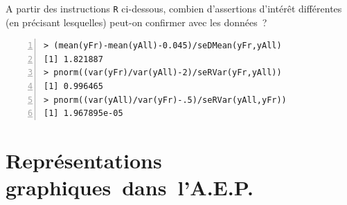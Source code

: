 \documentclass[10pt]{report}
\begin{document}
\begin{exercice}
A partir des instructions \texttt{R} ci-dessous, combien d'assertions d'intérêt différentes (en précisant lesquelles) peut-on confirmer avec les données~?

\begin{Verbatim}[frame=leftline,fontfamily=tt,fontshape=n,numbers=left]
> (mean(yFr)-mean(yAll)-0.045)/seDMean(yFr,yAll)
[1] 1.821887
> pnorm((var(yFr)/var(yAll)-2)/seRVar(yFr,yAll))
[1] 0.996465
> pnorm((var(yAll)/var(yFr)-.5)/seRVar(yAll,yFr))
[1] 1.967895e-05
\end{Verbatim}



\end{exercice}

\appendix\chapter{Représentations\\graphiques~dans~l'A.E.P.}\label{TdAEPGraph}
\end{document}
